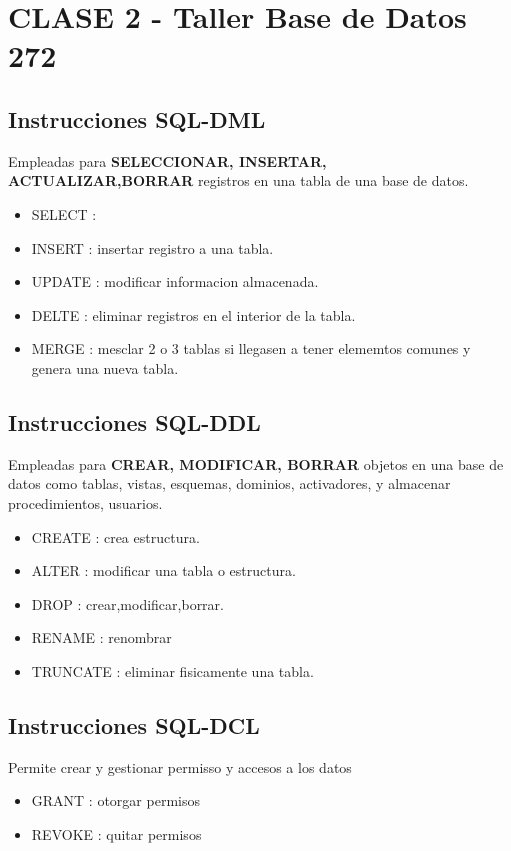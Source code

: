 \documentclass{article}
\begin{document}
         \section{CLASE 2 - Taller Base de Datos 272}
         \begin{multicols}{2}
            \subsection{Instrucciones SQL-DML}
                Empleadas para \textbf{SELECCIONAR, INSERTAR, ACTUALIZAR,BORRAR} registros en una tabla de una base de datos.
                    \begin{itemize}
                        \item SELECT : 
                        \item INSERT  : insertar registro a una tabla.
                        \item UPDATE : modificar informacion almacenada.
                        \item DELTE : eliminar registros en el interior de la tabla.
                        \item MERGE : mesclar 2 o 3 tablas si llegasen a tener elememtos comunes y genera una nueva tabla.
                    \end{itemize}
            \subsection{Instrucciones SQL-DDL}
                Empleadas para \textbf{CREAR, MODIFICAR, BORRAR} objetos en una base de datos como tablas, vistas, esquemas, dominios, activadores, y almacenar procedimientos, usuarios.
                    \begin{itemize}
                        \item CREATE : crea estructura.
                        \item ALTER  : modificar una tabla o estructura.
                        \item DROP : crear,modificar,borrar.
                        \item RENAME : renombrar
                        \item TRUNCATE : eliminar fisicamente una tabla.
                    \end{itemize}
            \subsection{Instrucciones SQL-DCL}
                    Permite crear y gestionar permisso y accesos a los datos
                    \begin{itemize}
                        \item GRANT : otorgar permisos
                        \item REVOKE  : quitar permisos
                    \end{itemize}


\end{multicols}
\end{document}
